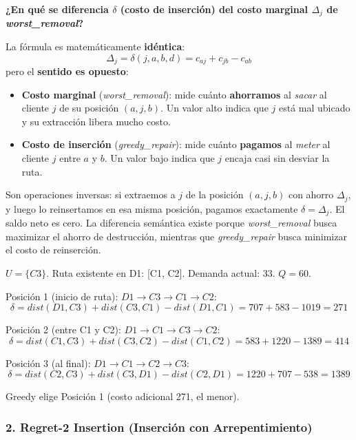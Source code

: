 \documentclass[12pt,a4paper]{article}
\begin{document}
\begin{nota}
\textbf{¿En qué se diferencia $\delta$ (costo de inserción) del costo marginal $\Delta_j$ de \textit{worst\_removal}?}

La fórmula es matemáticamente \textbf{idéntica}:
$$\Delta_j = \delta(j,a,b,d) = c_{aj} + c_{jb} - c_{ab}$$
pero el \textbf{sentido es opuesto}:

\begin{itemize}
  \item \textbf{Costo marginal} (\textit{worst\_removal}): mide cuánto \textbf{ahorramos} al \emph{sacar} al cliente $j$ de su posición $(a,j,b)$. Un valor alto indica que $j$ está mal ubicado y su extracción libera mucho costo.
  \item \textbf{Costo de inserción} (\textit{greedy\_repair}): mide cuánto \textbf{pagamos} al \emph{meter} al cliente $j$ entre $a$ y $b$. Un valor bajo indica que $j$ encaja casi sin desviar la ruta.
\end{itemize}

Son operaciones inversas: si extraemos a $j$ de la posición $(a,j,b)$ con ahorro $\Delta_j$, y luego lo reinsertamos en esa misma posición, pagamos exactamente $\delta = \Delta_j$. El saldo neto es cero. La diferencia semántica existe porque \textit{worst\_removal} busca maximizar el ahorro de destrucción, mientras que \textit{greedy\_repair} busca minimizar el costo de reinserción.
\end{nota}

\begin{ejemplo}
$U = \{C3\}$. Ruta existente en D1: [C1, C2]. Demanda actual: 33. $Q=60$.

Posición 1 (inicio de ruta): $D1 \to C3 \to C1 \to C2$:
$$\delta = dist(D1,C3) + dist(C3,C1) - dist(D1,C1) = 707+583-1019 = 271$$

Posición 2 (entre C1 y C2): $D1 \to C1 \to C3 \to C2$:
$$\delta = dist(C1,C3) + dist(C3,C2) - dist(C1,C2) = 583+1220-1389 = 414$$

Posición 3 (al final): $D1 \to C1 \to C2 \to C3$:
$$\delta = dist(C2,C3) + dist(C3,D1) - dist(C2,D1) = 1220+707-538 = 1389$$

Greedy elige Posición 1 (costo adicional 271, el menor).
\end{ejemplo}

\subsubsection{2. Regret-2 Insertion (Inserción con Arrepentimiento)}
\end{document}
